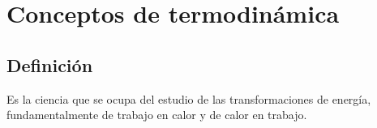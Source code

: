 \section{Conceptos de termodin\'amica}
	
	\subsection{Definici\'on}
	Es la ciencia que se ocupa del estudio de las transformaciones de energ\'ia, fundamentalmente de trabajo en calor y de calor en trabajo.










